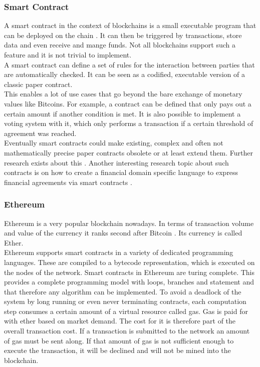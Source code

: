 \documentclass[a4paper,12pt]{scrartcl}
\begin{document}
\subsubsection{Smart Contract}

A smart contract in the context of blockchains is a small executable program that can be deployed on the chain \cite{web9}. It can then be triggered by transactions, store data and even receive and mange funds. Not all blockchains support such a feature and it is not trivial to implement.\\
A smart contract can define a set of rules for the interaction between parties that are automatically checked. It can be seen as a codified, executable version of a classic paper contract.\\

This enables a lot of use cases that go beyond the bare exchange of monetary values like Bitcoins. For example, a contract can be defined that only pays out a certain amount if another condition is met. It is also possible to implement a voting system with it, which only performs a transaction if a certain threshold of agreement was reached.\\

Eventually smart contracts could make existing, complex and often not mathematically precise paper contracts obsolete or at least extend them.
Further research exists about this \cite{Egbertsen2016}. Another interesting research topic about such contracts is on how to create a financial domain specific language to express financial agreements via smart contracts \cite{Biryukov2017}.

\subsubsection{Ethereum}

Ethereum \cite{web7} is a very popular blockchain nowadays. In terms of transaction volume and value of the currency it ranks second after Bitcoin \cite{web22}. Its currency is called Ether.\\

Ethereum supports smart contracts in a variety of dedicated programming languages. These are compiled to a bytecode representation, which is executed on the nodes of the network. Smart contracts in Ethereum are turing complete. This provides a complete programming model with loops, branches and statement and that therefore any algorithm can be implemented. To avoid a deadlock of the system by long running or even never terminating contracts, each computation step consumes a certain amount of a virtual resource called gas. Gas is paid for with ether based on market demand. The cost for it is therefore part of the overall transaction cost. If a transaction is submitted to the network an amount of gas must be sent along. If that amount of gas is not sufficient enough to execute the transaction, it will be declined and will not be mined into the blockchain.\\
\end{document}
